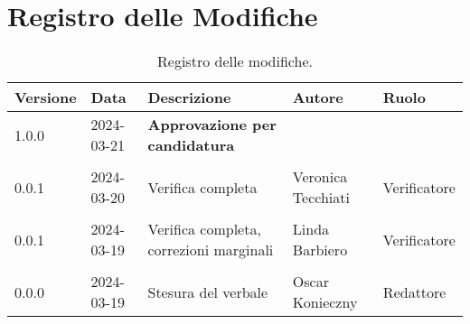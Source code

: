 \section*{Registro delle Modifiche}
\begin{table}[ht!]	
		\centering
		\begin{tabular}{p{1.2cm} p{2cm} p{6cm} p{3cm} p{2cm}}
			\toprule
			\textbf{Versione}& \textbf{Data} & \textbf{Descrizione} & \textbf{Autore} & \textbf{Ruolo} \\
			\midrule
			1.0.0 & 2024-03-21 & \textbf{Approvazione per candidatura} & & \\\\
			0.0.1 & 2024-03-20 & Verifica completa & Veronica Tecchiati & Verificatore \\\\
			0.0.1 & 2024-03-19 & Verifica completa, correzioni marginali & Linda Barbiero & Verificatore \\\\
			0.0.0 & 2024-03-19 & Stesura del verbale & Oscar Konieczny & Redattore \\
			\bottomrule
		\end{tabular}
		\caption{Registro delle modifiche.}
		\label{table:Registro delle modifiche}
\end{table}
